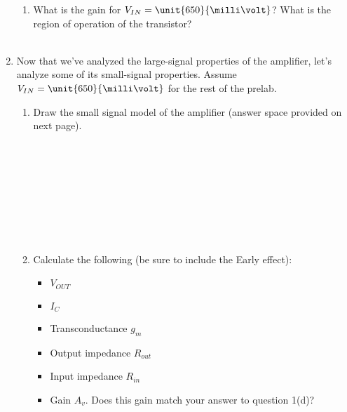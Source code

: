 \documentclass{article}
\begin{document}
\begin{enumerate}
\begin{enumerate}
		\item What is the gain for $V_{IN} = \unit{650}{\milli\volt}$? What is the region of operation of the transistor?
		~\\~\\

	\end{enumerate}

	\item Now that we've analyzed the large-signal properties of the amplifier, let's analyze some of its small-signal properties. Assume $V_{IN} = \unit{650}{\milli\volt}$ for the rest of the prelab.

	\begin{enumerate}

		\item Draw the small signal model of the amplifier (answer space provided on next page).
		~\\~\\~\\~\\~\\~\\~\\~\\~\\

		\item Calculate the following (be sure to include the Early effect):
			\begin{itemize}
			\item $V_{OUT}$
			\item $I_C$
			\item Transconductance $g_{m}$
			\item Output impedance $R_{out}$
			\item Input impedance $R_{in}$
			\item Gain $A_{v}$. Does this gain match your answer to question 1(d)?
			\end{itemize}
			~\\~\\~\\~\\~\\~\\~\\~\\~\\~\\~\\~\\~\\~\\~\\


\end{enumerate}
\end{enumerate}
\end{document}
